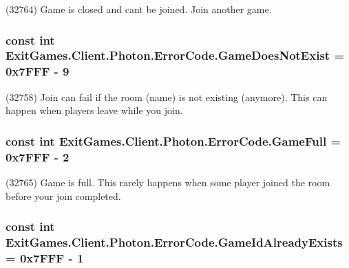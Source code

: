 (32764) Game is closed and can\textquotesingle{}t be joined. Join another game.

\subsubsection[{\texorpdfstring{Game\+Does\+Not\+Exist}{GameDoesNotExist}}]{\setlength{\rightskip}{0pt plus 5cm}const int Exit\+Games.\+Client.\+Photon.\+Error\+Code.\+Game\+Does\+Not\+Exist = 0x7\+F\+F\+F -\/ 9}\hypertarget{class_exit_games_1_1_client_1_1_photon_1_1_error_code_a06604e183d66776a53c489908f7126e0}{}\label{class_exit_games_1_1_client_1_1_photon_1_1_error_code_a06604e183d66776a53c489908f7126e0}


(32758) Join can fail if the room (name) is not existing (anymore). This can happen when players leave while you join.

\subsubsection[{\texorpdfstring{Game\+Full}{GameFull}}]{\setlength{\rightskip}{0pt plus 5cm}const int Exit\+Games.\+Client.\+Photon.\+Error\+Code.\+Game\+Full = 0x7\+F\+F\+F -\/ 2}\hypertarget{class_exit_games_1_1_client_1_1_photon_1_1_error_code_ae558d99e91f22c6e7c54a6b07f299a8a}{}\label{class_exit_games_1_1_client_1_1_photon_1_1_error_code_ae558d99e91f22c6e7c54a6b07f299a8a}


(32765) Game is full. This rarely happens when some player joined the room before your join completed.

\subsubsection[{\texorpdfstring{Game\+Id\+Already\+Exists}{GameIdAlreadyExists}}]{\setlength{\rightskip}{0pt plus 5cm}const int Exit\+Games.\+Client.\+Photon.\+Error\+Code.\+Game\+Id\+Already\+Exists = 0x7\+F\+F\+F -\/ 1}\hypertarget{class_exit_games_1_1_client_1_1_photon_1_1_error_code_a2898552672360480d562a6f9958790d9}{}\label{class_exit_games_1_1_client_1_1_photon_1_1_error_code_a2898552672360480d562a6f9958790d9}


